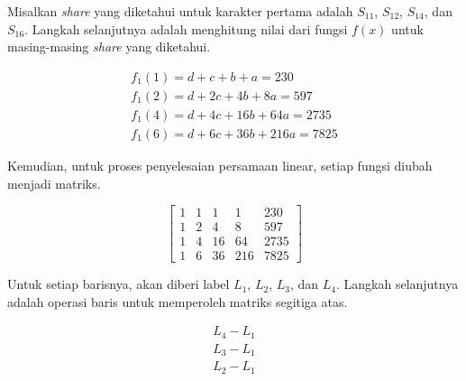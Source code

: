 Misalkan \textit{share} yang diketahui untuk karakter pertama adalah \begin{math}S_{11}\end{math}, \begin{math}S_{12}\end{math}, \begin{math}S_{14}\end{math}, dan \begin{math}S_{16}\end{math}. Langkah selanjutnya adalah menghitung nilai dari fungsi \begin{math}f(x)\end{math} untuk masing-masing \textit{share} yang diketahui.

\begin{gather*}
	f_1(1) = d + c + b + a = 230 \\
	f_1(2) = d + 2c + 4b + 8a = 597 \\
	f_1(4) = d + 4c + 16b + 64a = 2735 \\
	f_1(6) = d + 6c + 36b + 216a = 7825
\end{gather*}

Kemudian, untuk proses penyelesaian persamaan linear, setiap fungsi diubah menjadi matriks.

\begin{center}
	\setlength\arraycolsep{15pt}
	\[
	\begin{bmatrix}
			1 	& 1 	& 1 	& 1 		& 230 		\\[1em]
			1 	& 2 	& 4 	& 8 		& 597			\\[1em]
			1 	& 4 	& 16 	& 64 		& 2735		\\[1em]
			1 	& 6 	& 36 	& 216 	& 7825
	\end{bmatrix}
	\]
\end{center}

Untuk setiap barisnya, akan diberi label \begin{math}L_1\end{math}, \begin{math}L_2\end{math}, \begin{math}L_3\end{math}, dan \begin{math}L_4\end{math}. Langkah selanjutnya adalah operasi baris untuk memperoleh matriks segitiga atas.

\begin{align*}
	L_4 - L_1 \\
	L_3 - L_1 \\
	L_2 - L_1
\end{align*}

